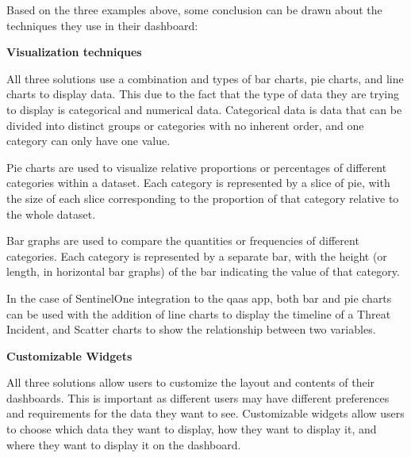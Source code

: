 \begin{multicols}{2}
      Based on the three examples above, some conclusion can be drawn about the techniques they use in their dashboard:

      \textbf{Visualization techniques}

      All three solutions use a combination and types of bar charts, pie charts, and line charts to display data. This due to the fact
      that the type of data they are trying to display is categorical and numerical data. Categorical data is data that can be divided
      into distinct groups or categories with no inherent order, and one category  can only have one value.

      Pie charts are used to visualize relative proportions or percentages of different categories within a dataset. Each category is
      represented by a slice of pie, with the size of each slice corresponding to the proportion of that category relative to the
      whole dataset.

      Bar graphs are used to compare the quantities or frequencies of different categories. Each category is represented by a separate
      bar, with the height (or length, in horizontal bar graphs) of the bar indicating the value of that category.

      In the case of SentinelOne integration to the \acrshort{qaas} app, both bar and pie charts can be used with the addition of
      line charts to display the timeline of a Threat Incident, and Scatter charts to show the relationship between two variables.

      \textbf{Customizable Widgets}

      All three solutions allow users to customize the layout and contents of their dashboards. This is important as different users
      may have different preferences and requirements for the data they want to see. Customizable widgets allow users to choose which
      data they want to display, how they want to display it, and where they want to display it on the dashboard.


\end{multicols}
